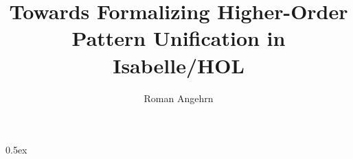\documentclass[11pt,a4paper]{article}
\begin{document}
\title{Towards Formalizing Higher-Order Pattern Unification in Isabelle/HOL}
\author{Roman Angehrn}
\maketitle

\tableofcontents

\parindent 0pt \parskip 0.5ex





\end{document}
